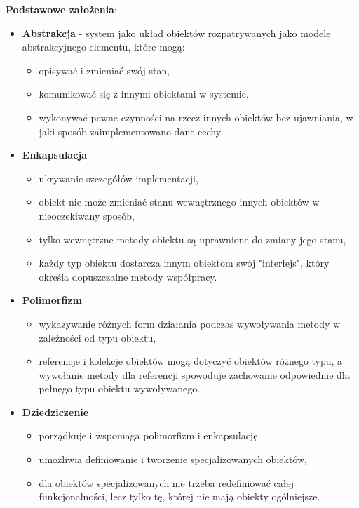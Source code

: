 \documentclass[a4paper]{article}
\begin{document}
    \textbf{Podstawowe założenia}:
    \begin{itemize}
        \item \textbf{Abstrakcja} - system jako układ obiektów rozpatrywanych jako modele
        abstrakcyjnego elementu, które mogą:
        \begin{itemize}
            \item opisywać i zmieniać swój stan,
            \item komunikować się z innymi obiektami w systemie,
            \item wykonywać pewne czynności na rzecz innych obiektów bez ujawniania, w jaki sposób zaimplementowano
            dane cechy.
        \end{itemize}
        \item \textbf{Enkapsulacja}
        \begin{itemize}
            \item ukrywanie szczegółów implementacji,
            \item obiekt nie może zmieniać stanu wewnętrznego innych obiektów w nieoczekiwany sposób,
            \item tylko wewnętrzne metody obiektu są uprawnione do zmiany jego stanu,
            \item każdy typ obiektu dostarcza innym obiektom swój "interfejs", który określa dopuszczalne metody współpracy.
        \end{itemize}
        \item \textbf{Polimorfizm}
        \begin{itemize}
            \item wykazywanie różnych form działania podczas wywoływania metody w zależności od typu obiektu,
            \item referencje i kolekcje obiektów mogą dotyczyć obiektów różnego typu, a wywołanie metody dla
            referencji spowoduje zachowanie odpowiednie dla pełnego typu obiektu wywoływanego.
        \end{itemize}
        \item \textbf{Dziedziczenie}
        \begin{itemize}
            \item porządkuje i wspomaga polimorfizm i enkapsulację,
            \item umożliwia definiowanie i tworzenie specjalizowanych obiektów,
            \item dla obiektów specjalizowanych nie trzeba redefiniować całej funkcjonalności, lecz tylko tę,
            której nie mają obiekty ogólniejsze.
        \end{itemize}
    \end{itemize}
\end{document}

